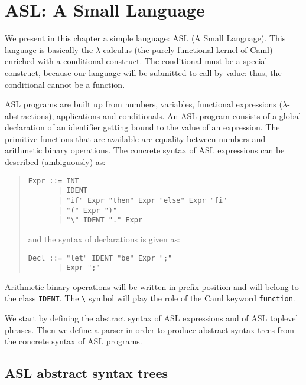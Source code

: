 \chapter{ASL: A Small Language}
\label{c:ASL}


We present in this chapter a simple language: ASL (A Small Language).
This language is basically the $\lambda$-calculus (the purely
functional kernel of Caml) enriched with a conditional construct. The
conditional must be a special construct, because our language will be
submitted to call-by-value: thus, the conditional cannot be a
function.
%

ASL programs are built up from numbers, variables, functional
expressions ($\lambda$-abstractions), applications and conditionals.
An ASL program consists of a global declaration of an identifier
getting bound to the value of an expression. The primitive functions that
are available are equality between numbers and arithmetic binary
operations.
The concrete syntax of ASL expressions can be described (ambiguously) as:
\begin{quote}
\begin{verbatim}
Expr ::= INT
       | IDENT
       | "if" Expr "then" Expr "else" Expr "fi"
       | "(" Expr ")"
       | "\" IDENT "." Expr
\end{verbatim}
and the syntax of declarations is given as:
\begin{verbatim}
Decl ::= "let" IDENT "be" Expr ";"
       | Expr ";"
\end{verbatim}
\end{quote}
Arithmetic binary operations will be written in prefix position and
will belong to the class {\tt IDENT}. The \verb|\| symbol will play
the role of the Caml keyword {\tt function}.

We start by defining the abstract syntax of ASL expressions and of ASL
toplevel phrases. Then we define a parser in order to produce abstract
syntax trees from the concrete syntax of ASL programs.

\section{ASL abstract syntax trees}

